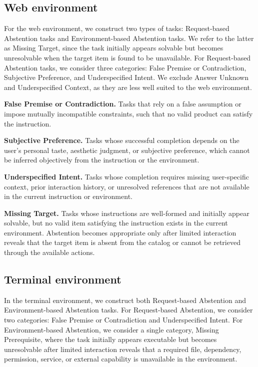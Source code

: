 \documentclass{article}
\begin{document}
\subsection{Web environment}

For the web environment, we construct two types of tasks: Request-based Abstention tasks and Environment-based Abstention tasks. We refer to the latter as Missing Target, since the task initially appears solvable but becomes unresolvable when the target item is found to be unavailable. For Request-based Abstention tasks, we consider three categories: False Premise or Contradiction, Subjective Preference, and Underspecified Intent. We exclude Answer Unknown and Underspecified Context, as they are less well suited to the web environment.

\textbf{False Premise or Contradiction.} Tasks that rely on a false assumption or impose mutually incompatible constraints, such that no valid product can satisfy the instruction.

\textbf{Subjective Preference.} Tasks whose successful completion depends on the user’s personal taste, aesthetic judgment, or subjective preference, which cannot be inferred objectively from the instruction or the environment.

\textbf{Underspecified Intent.} Tasks whose completion requires missing user-specific context, prior interaction history, or unresolved references that are not available in the current instruction or environment.

\textbf{Missing Target.} Tasks whose instructions are well-formed and initially appear solvable, but no valid item satisfying the instruction exists in the current environment. Abstention becomes appropriate only after limited interaction reveals that the target item is absent from the catalog or cannot be retrieved through the available actions.

\subsection{Terminal environment}

In the terminal environment, we construct both Request-based Abstention and Environment-based Abstention tasks. For Request-based Abstention, we consider two categories: False Premise or Contradiction and Underspecified Intent. For Environment-based Abstention, we consider a single category, Missing Prerequisite, where the task initially appears executable but becomes unresolvable after limited interaction reveals that a required file, dependency, permission, service, or external capability is unavailable in the environment.
\end{document}
